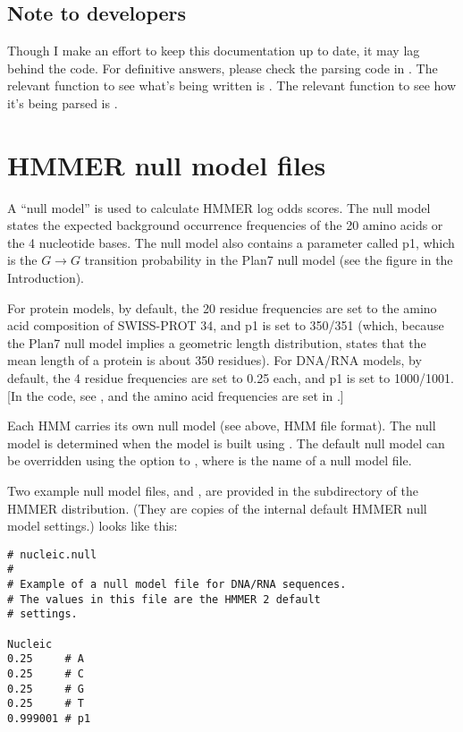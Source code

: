 \subsection{Note to developers}

Though I make an effort to keep this documentation up to date, it may
lag behind the code. For definitive answers, please check the parsing
code in . The relevant function to see what's being
written is . The relevant function to see how it's
being parsed is .


\section{HMMER null model files}

A ``null model'' is used to calculate HMMER log odds scores. The null
model states the expected background occurrence frequencies of the 20
amino acids or the 4 nucleotide bases. The null model also contains a
parameter called p1, which is the $G \rightarrow G$ transition
probability in the Plan7 null model (see the figure in the
Introduction).

For protein models, by default, the 20 residue frequencies are set to
the amino acid composition of SWISS-PROT 34, and p1 is set to 350/351
(which, because the Plan7 null model implies a geometric length
distribution, states that the mean length of a protein is about 350
residues). For DNA/RNA models, by default, the 4 residue frequencies
are set to 0.25 each, and p1 is set to 1000/1001.  [In the code, see
, and the amino acid frequencies are
set in .]

Each HMM carries its own null model (see above, HMM file format).  The
null model is determined when the model is built using
. The default null model can be overridden using
the  option to , where  is
the name of a null model file.  

Two example null model files,
 and , are provided
in the  subdirectory of the HMMER distribution. (They 
are copies of the internal default HMMER null model settings.)
 looks like this:

{\small\begin{verbatim}
# nucleic.null
#
# Example of a null model file for DNA/RNA sequences.
# The values in this file are the HMMER 2 default
# settings.

Nucleic
0.25     # A
0.25     # C
0.25     # G
0.25     # T
0.999001 # p1
\end{verbatim}}

